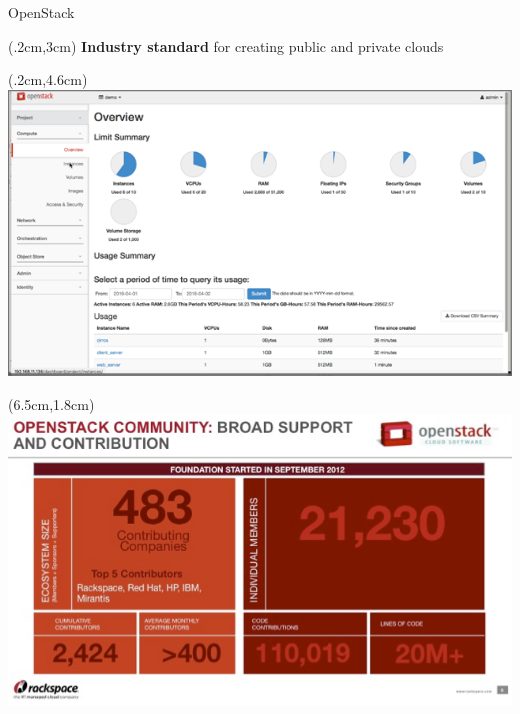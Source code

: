 \documentclass[10pt]{beamer}
\begin{document}

\begin{frame}[t,plain]
  \titlepage
\end{frame}


\begin{frame}{OpenStack}
  \begin{textblock*}{.5\paperwidth}(.2cm,3cm)
  	\centering\textbf{Industry standard} for creating public and private clouds
  \end{textblock*}

  \begin{textblock*}{.6\paperwidth}(.2cm,4.6cm)
   \includegraphics[scale=.65]{figs/dashboard.png}
  \end{textblock*}

  \begin{textblock*}{6cm}(6.5cm,1.8cm)
	 \includegraphics[scale=1.1,angle=350]{figs/os_metrics.png}
  \end{textblock*}

\end{frame}
\end{document}

